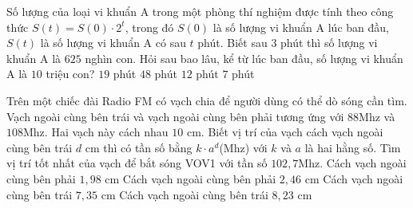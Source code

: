 \begin{ex}%
	Số lượng của loại vi khuẩn A trong một phòng thí nghiệm được tính theo công thức $S(t)=S(0) \cdot 2^t$, trong đó $S(0)$ là số lượng vi khuẩn A lúc ban đầu, $S(t)$ là số lượng vi khuẩn A có sau $t$ phút. Biết sau $3$ phút thì số lượng vi khuẩn A là $625$ nghìn con. Hỏi sau bao lâu, kể từ lúc ban đầu, số lượng vi khuẩn A là $10$ triệu con?
	\choice
	{$19$ phút}
	{$48$ phút}
	{$12$ phút}
	{\True $7$ phút}
	
\end{ex}

\begin{ex}%
	Trên một chiếc đài Radio FM có vạch chia để người dùng có thể dò sóng cần tìm. Vạch ngoài cùng bên trái và vạch ngoài cùng bên phải tương ứng với $88$Mhz và $108$Mhz. Hai vạch này cách nhau $10$ cm. Biết vị trí của vạch cách vạch ngoài cùng bên trái $d$ cm thì có tần số bằng $k \cdot a^d$(Mhz) với $k$ và $a$ là hai hằng số. Tìm vị trí tốt nhất của vạch để bắt sóng VOV1 với tần số $102,7$Mhz.
	\choice
	{Cách vạch ngoài cùng bên phải $1,98$ cm}
	{Cách vạch ngoài cùng bên phải $2,46$ cm}
	{\True Cách vạch ngoài cùng bên trái $7,35$ cm}
	{Cách vạch ngoài cùng bên trái $8,23$ cm}
	
\end{ex}

